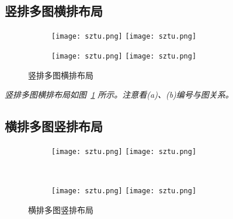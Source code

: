 \lipsum

\subsection{竖排多图横排布局}

\begin{figure}[!htb]
    \centering
    \begin{subfigure}[t]{0.13\linewidth}
        \begin{minipage}[b]{1\linewidth}
        \texttt{[image: sztu.png]} \vspace{-1ex} \vfill
        \texttt{[image: sztu.png]}
        \end{minipage}
        \caption{}
    \end{subfigure}
    \begin{subfigure}[t]{0.13\linewidth}
        \begin{minipage}[b]{1\linewidth}
        \texttt{[image: sztu.png]} \vspace{-1ex} \vfill
        \texttt{[image: sztu.png]}
        \end{minipage}
        \caption{}
    \end{subfigure}
    \caption{竖排多图横排布局}
    \label{F.sztu_col_row}
\end{figure}

\emph{竖排多图横排布局如图~\ref{F.sztu_col_row} 所示。注意看(a)、(b)编号与图关系。}


\subsection{横排多图竖排布局}

\lipsum

\begin{figure}[!htb]
    \centering
    \begin{subfigure}[t]{0.3\linewidth}
        \begin{minipage}[b]{1\linewidth}
        \texttt{[image: sztu.png]}
        \texttt{[image: sztu.png]}
        \end{minipage}
        \caption{}
    \end{subfigure}\\
    \begin{subfigure}[t]{0.3\linewidth}
        \begin{minipage}[b]{1\linewidth}
        \texttt{[image: sztu.png]}
        \texttt{[image: sztu.png]}
        \end{minipage}
        \caption{}
    \end{subfigure}
    \caption{横排多图竖排布局}
    \label{F.sztu_row_col}
\end{figure}

